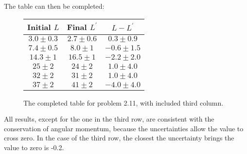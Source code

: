 \documentclass[12pt]{article}
\begin{document}
The table can then be completed:

\begin{figure}[H]
  \begin{center}
    \label{tab:2.11}
    \begin{tabular}{|c|c|c|}
      \hline
      Initial \(L\) & Final \(L^\prime\) & \(L - L^\prime\) \\
      \hline
      \(3.0 \pm 0.3\) & \(2.7 \pm 0.6\) & \(0.3 \pm 0.9\) \\
      \(7.4 \pm 0.5\) & \(8.0 \pm 1\) & \(-0.6 \pm 1.5\) \\
      \(14.3 \pm 1\) & \(16.5 \pm 1\) & \(-2.2 \pm 2.0\) \\
      \(25 \pm 2\) & \(24 \pm 2\) & \(1.0 \pm 4.0\) \\
      \(32 \pm 2\) & \(31 \pm 2\) & \(1.0 \pm 4.0\) \\
      \(37 \pm 2\) & \(41 \pm 2\) & \(-4.0 \pm 4.0\) \\
      \hline
    \end{tabular}
    \caption{The completed table for problem 2.11, with included third column.}
  \end{center}
\end{figure}

All results, except for the one in the third row, are consistent with the
conservation of angular momentum, because the uncertainties allow the value to
cross zero. In the case of the third row, the closest the uncertainty brings the
value to zero is -0.2.




\end{document}
